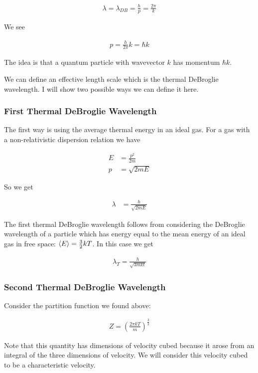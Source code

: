 \documentclass[12pt]{article}
\begin{document}
\begin{align}
\lambda = \lambda_{DB} = \frac{h}{p} = \frac{2\pi}{k}
\end{align}

We see

\begin{align}
p = \frac{h}{2\pi} k = \hbar k
\end{align}

The idea is that a quantum particle with wavevector $k$ has momentum $\hbar k$.

We can define an effective length scale which is the thermal DeBroglie wavelength. I will show two possible ways we can define it here.

\subsubsection{First Thermal DeBroglie Wavelength}

The first way is using the average thermal energy in an ideal gas. For a gas with a non-relativistic dispersion relation we have

\begin{align}
E &= \frac{p^2}{2m}\\
p &= \sqrt{2mE}
\end{align}

So we get

\begin{align}
\lambda &= \frac{h}{\sqrt{2mE}}
\end{align}

The first thermal DeBroglie wavelength follows from considering the DeBroglie wavelength of a particle which has energy equal to the mean energy of an ideal gas in free space: $\Braket{E} = \frac{3}{2} kT$. In this case we get

\begin{align}
\lambda_T = \frac{h}{\sqrt{3mkt}}
\end{align}

\subsubsection{Second Thermal DeBroglie Wavelength}

Consider the partition function we found above:

\begin{align}
Z = \left(\frac{2\pi kT}{m} \right)^{\frac{3}{2}}
\end{align}

Note that this quantity has dimensions of velocity cubed because it arose from an integral of the three dimensions of velocity. We will consider this velocity cubed to be a characteristic velocity.
\end{document}

